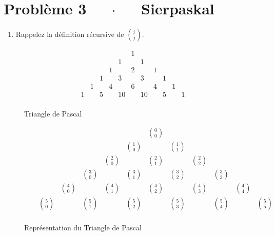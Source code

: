 \documentclass[16pt]{report}
\begin{document}
\begin{multicols*}{2}
\begin{enumerate}
\end{enumerate}  

    \section*{Problème 3 $\quad$ $\cdot$  $\quad$ Sierpaskal}
    

    \begin{enumerate}
        \item Rappelez la définition récursive de $i \choose j$.  
    \end{enumerate}

    \begin{figure}[H]
                \[
                \begin{array}{ccccccccccccc}
                 & & & & & 1 & & & & & \\
                 & & & & 1 & & 1 & & & & \\
                 & & & 1 & & 2 & & 1 & & & \\
                 & & 1 & & 3 & & 3 & & 1 & & \\
                 & 1 & & 4 & & 6 & & 4 & & 1 & \\
                1 & & 5 & & 10 & & 10 & & 5 & & 1 \\
                \end{array}
                \]
    \caption{Triangle de Pascal }
    \end{figure}

    \begin{figure}[H]
\[
        \begin{array}{ccccccccccccccccc}
         & & & & & & & \binom{0}{0} & & & & & & & & \\
         & & & & & & \binom{1}{0} & & \binom{1}{1} & & & & & & & \\
         & & & & & \binom{2}{0} & & \binom{2}{1} & & \binom{2}{2} & & & & & & \\
         & & & & \binom{3}{0} & & \binom{3}{1} & & \binom{3}{2} & & \binom{3}{3} & & & & & \\
         & & & \binom{4}{0} & & \binom{4}{1} & & \binom{4}{2} & & \binom{4}{3} & & \binom{4}{4} & & & & \\
         & & \binom{5}{0} & & \binom{5}{1} & & \binom{5}{2} & & \binom{5}{3} & & \binom{5}{4} & & \binom{5}{5} & & & \\
        \end{array}
\]
    \caption{Représentation du Triangle de Pascal}
    \end{figure}


\end{multicols*}
\end{document}
